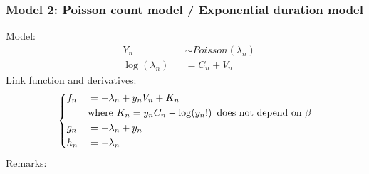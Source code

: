 \documentclass[12pt]{article}
\begin{document}
\subsubsection{Model 2: Poisson count model / Exponential duration model}
Model:
\begin{equation}
\begin{aligned}
	& Y_n && \sim Poisson(\lambda_n) \\
	& \log(\lambda_n) && = C_n + V_n
\end{aligned}
\end{equation}
Link function and derivatives:
\begin{equation}
\left\{ \begin{aligned}
	& f_n && =  - \lambda_n + y_n V_n + K_n  \\
	& && \text{where } K_n =  y_n C_n - \log(y_n!) \hspace*{5pt} \text{does not depend on } \beta \\
	& g_n && =  - \lambda_n + y_n \\
	& h_n && =  - \lambda_n \\
\end{aligned} \right.
\end{equation}
\underline{Remarks}:
\end{document}
